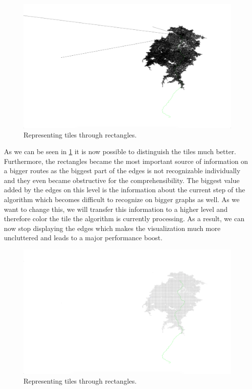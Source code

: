 \documentclass
[
	paper = a4,
    pagesize,
	12 pt,
	oneside,                       %
    open = right,
	DIV = calc,
	BCOR = 0 mm,                   %
	bibtotoc
]
{scrbook}
\begin{document}
\begin{figure}[H]
    \includegraphics[width=\textwidth]{Images/vis-rectangular-tiles.png}
\caption[]{Representing tiles through rectangles.}
\label{fig:rectangle_tiles}
\end{figure}

As we can be seen in \cref{fig:rectangle_tiles} it is now possible to distinguish the tiles much better.
Furthermore, the rectangles became the most important source of information on a bigger routes as the biggest part of the edges is not recognizable individually and they even became obstructive for the comprehensibility.
The biggest value added by the edges on this level is the information about the current step of the algorithm which becomes difficult to recognize on bigger graphs as  well.
As we want to change this, we will transfer this information to a higher level and therefore color the tile the algorithm is currently processing.
As a result, we can now stop displaying the edges which makes the visualization much more uncluttered and leads to a major performance boost.

\begin{figure}[H]
    \includegraphics[width=\textwidth]{Images/vis-current-tile.png}
\caption[]{Representing tiles through rectangles.}
\label{fig:color_current_tile}
\end{figure}
\end{document}
